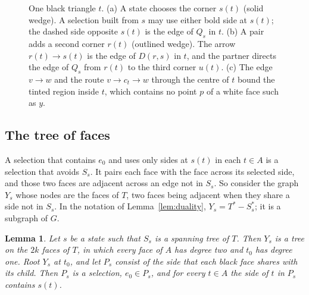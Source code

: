 \documentclass[10pt]{amsart}
\numberwithin{equation}{section}
\newtheorem{lemma}[equation]{Lemma}
\theoremstyle{definition}
\theoremstyle{remark}
\newcommand{\T}{T}
\newcommand{\Dc}{D}
\begin{document}
\begin{figure}[t]
\caption{One black triangle $t$. (a) A state chooses the corner $s(t)$ (solid wedge). A selection built from $s$ may use either bold side at $s(t)$; the dashed side opposite $s(t)$ is the edge of $Q_s$ in $t$. (b) A pair adds a second corner $r(t)$ (outlined wedge). The arrow $r(t)\to s(t)$ is the edge of $\Dc(r,s)$ in $t$, and the partner directs the edge of $Q_s$ from $r(t)$ to the third corner $u(t)$. (c) The edge $v\to w$ and the route $v\to c_t\to w$ through the centre of $t$ bound the tinted region inside $t$, which contains no point $p$ of a white face such as $y$.}
\label{fig:local}
\end{figure}

\subsection*{The tree of faces}
A selection that contains $e_0$ and uses only sides at $s(t)$ in each $t\in A$ is a selection that avoids $S_s$.
It pairs each face with the face across its selected side, and those two faces are adjacent across an edge not in $S_s$.
So consider the graph $Y_s$ whose nodes are the faces of $\T$, two faces being adjacent when they share a side not in $S_s$.
In the notation of Lemma~\ref{lem:duality}, $Y_s=\T^*-S_s^*$; it is a subgraph of $G$.

\begin{lemma}\label{lem:Y}
Let $s$ be a state such that $S_s$ is a spanning tree of $\T$.
Then $Y_s$ is a tree on the $2k$ faces of $\T$, in which every face of $A$ has degree two and $t_0$ has degree one.
Root $Y_s$ at $t_0$, and let $P_s$ consist of the side that each black face shares with its child.
Then $P_s$ is a selection, $e_0\in P_s$, and for every $t\in A$ the side of $t$ in $P_s$ contains $s(t)$.
\end{lemma}
\end{document}
